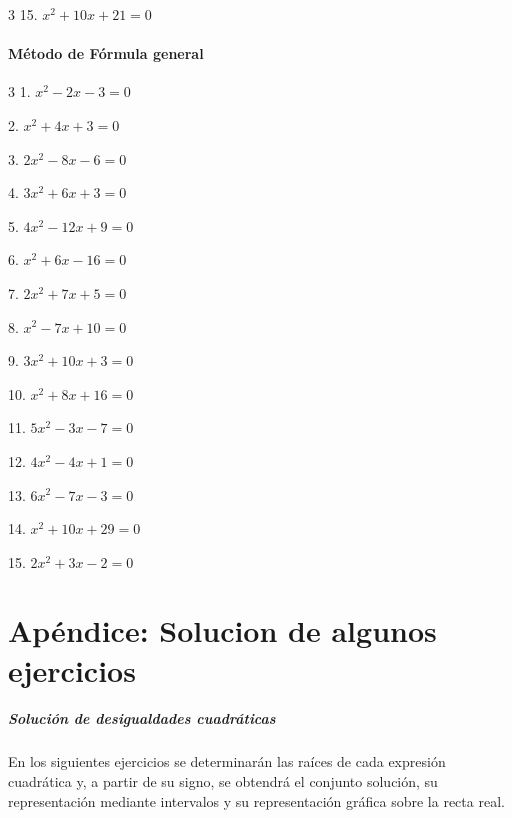\documentclass[12pt]{article}
\theoremstyle{plain}
\theoremstyle{definition}
\theoremstyle{remark}
\begin{document}
{\begin{multicols}{3}
15. $x^2 + 10x + 21 = 0$
\end{multicols}
\subsection*{Método de Fórmula general}

\begin{multicols}{3}
1. $x^2 - 2x - 3 = 0$

2. $x^2 + 4x + 3 = 0$

3. $2x^2 - 8x - 6 = 0$

4. $3x^2 + 6x + 3 = 0$

5. $4x^2 - 12x + 9 = 0$

6. $x^2 + 6x - 16 = 0$

7. $2x^2 + 7x + 5 = 0$

8. $x^2 - 7x + 10 = 0$

9. $3x^2 + 10x + 3 = 0$

10. $x^2 + 8x + 16 = 0$

11. $5x^2 - 3x - 7 = 0$

12. $4x^2 - 4x + 1 = 0$

13. $6x^2 - 7x - 3 = 0$

14. $x^2 + 10x + 29 = 0$

15. $2x^2 + 3x - 2 = 0$
\end{multicols}

\part{Ap\'endice: Solucion de algunos ejercicios}
\setcounter{section}{3}

\subsubsection*{Solución de desigualdades cuadráticas}
En los siguientes ejercicios se determinarán las raíces de cada expresión
cuadrática y, a partir de su signo, se obtendrá el conjunto solución,
su representación mediante intervalos y su representación gráfica sobre
la recta real.

}
\end{document}
